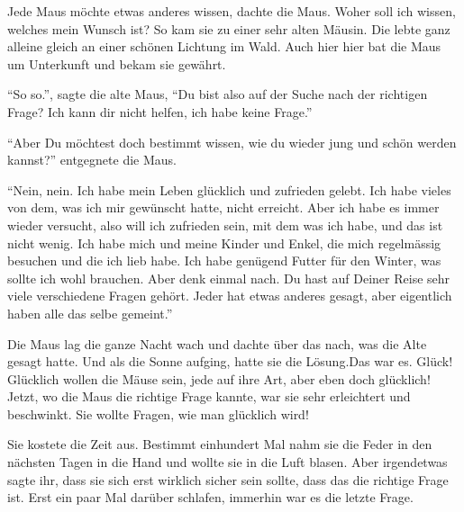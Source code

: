 Jede Maus möchte etwas anderes wissen, dachte die Maus. Woher soll ich wissen, welches mein Wunsch ist? So kam sie zu einer sehr alten Mäusin. Die lebte ganz alleine gleich an einer schönen Lichtung im Wald. Auch hier hier bat die Maus um Unterkunft und bekam sie gewährt. 

\enquote{So so.}, sagte die alte Maus, \enquote{Du bist also auf der Suche nach der richtigen Frage? Ich kann dir nicht helfen, ich habe keine Frage.} 

\enquote{Aber Du möchtest doch bestimmt wissen, wie du wieder jung und schön werden kannst?} entgegnete die Maus.

\enquote{Nein, nein. Ich habe mein Leben glücklich und zufrieden gelebt. Ich habe vieles von dem, was ich mir gewünscht hatte, nicht erreicht. Aber ich habe es immer wieder versucht, also will ich zufrieden sein, mit dem was ich habe, und das ist nicht wenig. Ich habe mich und meine Kinder und Enkel, die mich regelmässig besuchen und die ich lieb habe. Ich habe genügend Futter für den Winter, was sollte ich wohl brauchen. Aber denk einmal nach. Du hast auf Deiner Reise sehr viele verschiedene Fragen gehört. Jeder hat etwas anderes gesagt, aber eigentlich haben alle das selbe gemeint.}

Die Maus lag die ganze Nacht wach und dachte über das nach, was die Alte gesagt hatte. Und als die Sonne aufging, hatte sie die Lösung.Das war es. Glück! Glücklich wollen die Mäuse sein, jede auf ihre Art, aber eben doch glücklich! Jetzt, wo die Maus die richtige Frage kannte, war sie sehr erleichtert und beschwinkt. Sie wollte Fragen, wie man glücklich wird! 

Sie kostete die Zeit aus. Bestimmt einhundert Mal nahm sie die Feder in den nächsten Tagen in die Hand und wollte sie in die Luft blasen. Aber irgendetwas sagte ihr, dass sie sich erst wirklich sicher sein sollte, dass das die richtige Frage ist. Erst ein paar Mal darüber schlafen, immerhin war es die letzte Frage.

